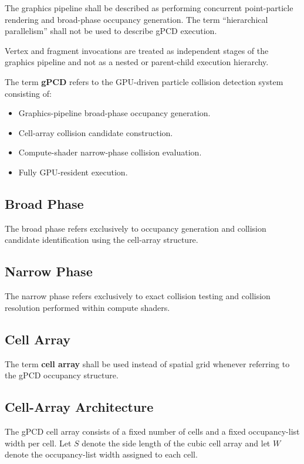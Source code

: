 The graphics pipeline shall be described as performing
concurrent point-particle rendering and broad-phase occupancy
generation. The term ``hierarchical parallelism'' shall not
be used to describe gPCD execution.

Vertex and fragment invocations are treated as independent
stages of the graphics pipeline and not as a nested or
parent-child execution hierarchy.



The term \textbf{gPCD} refers to the GPU-driven particle collision detection
system consisting of:

\begin{itemize}
\item Graphics-pipeline broad-phase occupancy generation.
\item Cell-array collision candidate construction.
\item Compute-shader narrow-phase collision evaluation.
\item Fully GPU-resident execution.
\end{itemize}

\subsection{Broad Phase}

The broad phase refers exclusively to occupancy generation and collision
candidate identification using the cell-array structure.

\subsection{Narrow Phase}

The narrow phase refers exclusively to exact collision testing and collision
resolution performed within compute shaders.

\subsection{Cell Array}

The term \textbf{cell array} shall be used instead of spatial grid whenever
referring to the gPCD occupancy structure.

\subsection*{Cell-Array Architecture}

The gPCD cell array consists of a fixed number of cells and a fixed
occupancy-list width per cell. Let $S$ denote the side length of the
cubic cell array and let $W$ denote the occupancy-list width assigned
to each cell.

